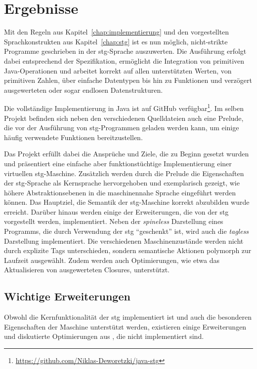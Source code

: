 
\chapter{Ergebnisse}\label{chap:ergebnisse}

Mit den Regeln aus Kapitel~\ref{chap:implementierung} und den vorgestellten Sprachkonstrukten aus Kapitel~\ref{chap:stg} ist es nun möglich, nicht-strikte Programme geschrieben in der \gls{stg}-Sprache auszuwerten.
Die Ausführung erfolgt dabei entsprechend der Spezifikation, ermöglicht die Integration von primitiven Java-Operationen und arbeitet korrekt auf allen unterstützten Werten, von primitiven Zahlen, über einfache Datentypen bis hin zu Funktionen und verzögert ausgewerteten oder sogar endlosen Datenstrukturen.

Die vollständige Implementierung in Java ist auf GitHub verfügbar\footnote{\url{https://github.com/Niklas-Deworetzki/java-stg}}.
Im selben Projekt befinden sich neben den verschiedenen Quelldateien auch eine Prelude, die vor der Ausführung von \gls{stg}-Programmen geladen werden kann, um einige häufig verwendete Funktionen bereitzustellen.

Das Projekt erfüllt dabei die Ansprüche und Ziele, die zu Beginn gesetzt wurden und präsentiert eine einfache aber funktionstüchtige Implementierung einer virtuellen \gls{stg}-Maschine.
Zusätzlich werden durch die Prelude die Eigenschaften der \gls{stg}-Sprache als Kernsprache hervorgehoben und exemplarisch gezeigt, wie höhere Abstraktionsebenen in die maschinennahe Sprache eingeführt werden können.
Das Hauptziel, die Semantik der \gls{stg}-Maschine korrekt abzubilden wurde erreicht.
Darüber hinaus werden einige der Erweiterungen, die von der \gls{stg} vorgestellt werden, implementiert.
Neben der \textit{spineless} Darstellung eines Programms, die durch Verwendung der \gls{stg} \enquote{geschenkt} ist, wird auch die \textit{tagless} Darstellung implementiert.
Die verschiedenen Maschinenzustände werden nicht durch explizite Tags unterschieden, sondern semantische Aktionen polymorph zur Laufzeit ausgewählt.
Zudem werden auch Optimierungen, wie etwa das Aktualisieren von ausgewerteten Closures, unterstützt.

\section{Wichtige Erweiterungen}

Obwohl die Kernfunktionalität der \gls{stg} implementiert ist und auch die besonderen Eigenschaften der Maschine unterstützt werden, existieren einige Erweiterungen und diskutierte Optimierungen aus , die nicht implementiert sind.


